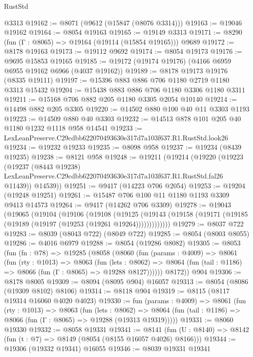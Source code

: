 \begin{lexlean}{RustStd}
\begin{coremodule}
    @3313
@19162 := @8071 (@9612 (@15847 (@8076 @3314)))
@19163 := @19046 @19162
@19164 := @8054 @19163
@19165 := @19149 @3313
@19171 := @8290 (fun (Γ : @8065) => @19164 (@19114 (@15854 @19165))) @9689
@19172 := @8178 @19163
@19173 := @19112 @9692
@19174 := @8054 @19173
@19176 := @9695 @15853 @19165
@19185 := @19172 (@19174 @19176) (@4166 @6959 @6955 @19162 @6966 (@4037 @19162))
@19189 := @8178 @19173 @19176 (@8335 @19111)
@19197 := @15396 @883 @886 @706 @1180 @2719 @1180 @3313 @15432
@19204 := @15438 @883 @886 @706 @1180 @3306 @1180 @3311
@19211 := @15168 @706 @882 @205 @1180 @3305 @2054 @10140
@19214 := @14498 @882 @205 @3305
@19220 := @14502 @880 @100 @40 @11 @3303 @1193
@19223 := @14509 @880 @40 @3303
@19232 := @14513 @878 @101 @205 @40 @1180 @1232 @1118 @958 @14541
@19233 := LexLeanPreserve.C29cdbb622070493630e317d7a103f637.R1.RustStd.look26
@19234 := @19232 @19233
@19235 := @8098 @958
@19237 := @19234 (@8439 @19235)
@19238 := @8121 @958
@19248 := @19211
    (@19214
      (@19220
        (@19223
          (@19237
            (@8443 @19238)
            LexLeanPreserve.C29cdbb622070493630e317d7a103f637.R1.RustStd.fal26
            @11439))
        @14539))
@19251 := @9417 (@14223 @706 @2054)
@19253 := @19204 (@19248 @19251)
@19261 := @15487 @706 @100 @11 @1180 @1193 @3309 @9413 @14573
@19264 := @9417 (@14262 @706 @3309)
@19278 := @19043
    (@19065
      (@19104
        (@19106
          (@19108
            (@19125
              (@19143 (@19158 (@19171 (@19185 (@19189 (@19197 (@19253 (@19261 @19264)))))))))))))
@19279 := @8037 @722
@19283 := @8039 (@8043 @722) (@8049 @722)
@19285 := @8054 (@8003 @8055)
@19286 := @4016 @6979
@19288 := @8054 (@19286 @8082)
@19305 := @8053
    (fun (fn : @78) =>
    @19285
      (@8058
        (@8060
          (fun (params : @4009) =>
          @8061
            (fun (rty : @1013) =>
            @8063
              (fun (lets : @8062) =>
              @8064 (fun (tail : @1186) => @8066 (fun (Γ : @8065) => @19288 @8127))))))
        @8172))
    @904
@19306 := @8178 @8005
@19309 := @8094 (@8095 @904) @16057
@19313 := @8054 (@8086 (@19309 @8102) @8106)
@19314 := @8118 @904
@19319 := @8115 (@8117 @19314 @16060 @4020 @4023)
@19330 := fun (params : @4009) =>
  @8061
    (fun (rty : @1013) =>
    @8063
      (fun (lets : @8062) =>
      @8064 (fun (tail : @1186) => @8066 (fun (Γ : @8065) => @19288 (@19313 @19319)))))
@19331 := @8060 @19330
@19332 := @8058 @19331
@19341 := @8141
    (fun (U : @8140) => @8142 (fun (t : @7) => @8149 (@8054 (@8155 @16057 @4026) @8166)))
@19344 := @19306 (@19332 @19341) @16055
@19346 := @8039 @19331 @19341

\end{coremodule}
\end{lexlean}
